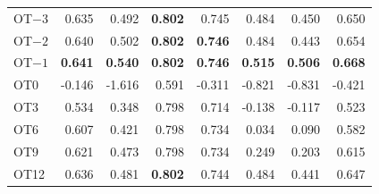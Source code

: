 {\begin{longtable}{@{}lrrrrrrr@{}}
OT$-3$ & \phantom{-}0.635 & \phantom{-}0.492 & \textbf{\phantom{-}0.802} & \phantom{-}0.745 & \phantom{-}0.484 & \phantom{-}0.450 & \phantom{-}0.650 \\
OT$-2$ & \phantom{-}0.640 & \phantom{-}0.502 & \textbf{\phantom{-}0.802} & \textbf{\phantom{-}0.746} & \phantom{-}0.484 & \phantom{-}0.443 & \phantom{-}0.654 \\
OT$-1$ & \textbf{\phantom{-}0.641} & \textbf{\phantom{-}0.540} & \textbf{\phantom{-}0.802} & \textbf{\phantom{-}0.746} & \textbf{\phantom{-}0.515} & \textbf{\phantom{-}0.506} & \textbf{\phantom{-}0.668} \\
OT0 & -0.146 & -1.616 & \phantom{-}0.591 & -0.311 & -0.821 & -0.831 & -0.421 \\
OT3 & \phantom{-}0.534 & \phantom{-}0.348 & \phantom{-}0.798 & \phantom{-}0.714 & -0.138 & -0.117 & \phantom{-}0.523 \\
OT6 & \phantom{-}0.607 & \phantom{-}0.421 & \phantom{-}0.798 & \phantom{-}0.734 & \phantom{-}0.034 & \phantom{-}0.090 & \phantom{-}0.582 \\
OT9 & \phantom{-}0.621 & \phantom{-}0.473 & \phantom{-}0.798 & \phantom{-}0.734 & \phantom{-}0.249 & \phantom{-}0.203 & \phantom{-}0.615 \\
OT12 & \phantom{-}0.636 & \phantom{-}0.481 & \textbf{\phantom{-}0.802} & \phantom{-}0.744 & \phantom{-}0.484 & \phantom{-}0.441 & \phantom{-}0.647 \\
\end{longtable}
}

